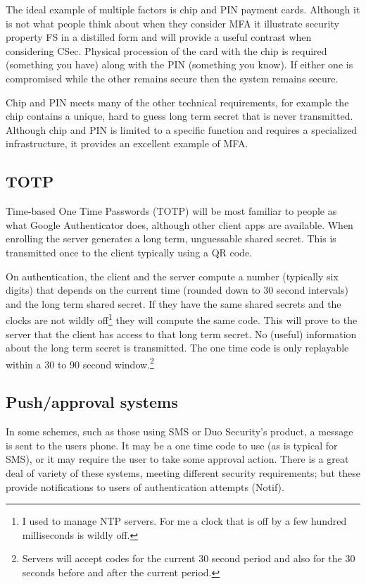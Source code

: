 \documentclass{soups}
\newcommand{\prop}[1]{\textsf{#1}}
\begin{document}
The ideal example of multiple factors is chip and PIN payment cards. Although it is not what people think about when they consider MFA it illustrate security property  \prop{FS} in a distilled form and will provide a useful contrast when considering \prop{CSec}.
Physical procession of the card with the chip is required (something you have) along with the PIN (something you know).
If either one is compromised while the other remains secure then the system remains secure.

Chip and PIN meets many of the other technical requirements,
for example the chip contains a unique, hard to guess long term secret that is never transmitted.
Although chip and PIN is limited to a specific function and requires a specialized infrastructure, it provides an excellent example of MFA.\@

\subsection{TOTP}\label{sec:totp}

Time-based One Time Passwords (TOTP) will be most familiar to people as what Google Authenticator does, although other client apps are available.
When enrolling the server generates a long term, unguessable shared secret. This is transmitted once to the client typically using a QR code.

On authentication, the client and the server compute a number (typically six digits) that depends on the current time (rounded down to 30 second intervals) and the long term shared secret.
If they have the same shared secrets and the clocks are not wildly off\footnote{I used to manage NTP servers. For me a clock that is off by a few hundred milliseconds is wildly off.} they will compute the same code.
This will prove to the server that the client has access to that long term secret.
No (useful) information about the long term secret is transmitted.
The one time code is only replayable within a 30 to 90 second window.\footnote
  {Servers will accept codes for the current 30 second period and also for the 30 seconds before and after the current period.}

\subsection{Push/approval systems}\label{sec:push}

In some schemes, such as those using SMS or Duo Security's product,
a message is sent to the users phone.
It may be a one time code to use (as is typical for SMS),
or it may require the user to take some approval action.
There is a great deal of variety of these systems,
meeting different security requirements;
but these provide notifications to users of authentication
attempts (\prop{Notif}).
\end{document}
